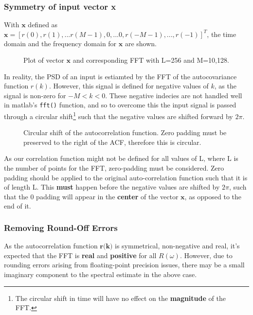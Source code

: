 \documentclass[main.tex]{subfiles}
\begin{document}
\subsubsection{Symmetry of input vector x}

With $\textbf{x}$ defined as $\textbf{x} = [r(0), r(1),...r(M-1),0,...0,r(-M-1),...,r(-1)]^T$, the time domain and the frequency domain for $\textbf{x}$ are shown. 

\begin{figure}[H]
	\centering 
	\resizebox{\textwidth}{!}{}
	\caption{Plot of vector $\textbf{x}$ and corresponding FFT with L=256 and M=10,128.}
	\label{fig:q1_2_a}
\end{figure}


In reality, the PSD of an input is estiamted by the FFT of the autocovariance function $r(k)$. However, this signal is defined for negative values of $k$, as the signal is non-zero for $-M < k < 0$. These negative indecies are not handled well in matlab's {\tt fft()} function, and so to overcome this the input signal is passed through a circular shift\footnote{The circular shift in time will have no effect on the \textbf{magnitude} of the FFT.} such that the negative values are shifted forward by $2\pi$.

\begin{figure}[H]
	\centering 
	\resizebox{0.8\textwidth}{!}{}
	\caption{Circular shift of the autocorrelation function. Zero padding must be preserved to the right of the ACF, therefore this is circular.}
	\label{fig:q1_2_a-shift}
\end{figure}

As our correlation function might not be defined for all values of L, where L is the number of points for the FFT, zero-padding must be considered. Zero padding should be applied to the original auto-correlation function such that it is of length L. This \textbf{must} happen before the negative values are shifted by $2\pi$, such that the 0 padding will appear in the \textbf{center} of the vector $\textbf{x}$, as opposed to the end of it.


\subsubsection{Removing Round-Off Errors}

As the autocorrelation function $\textbf{r(k)}$ is symmetrical, non-negative and real, it's expected that the FFT is \textbf{real} and \textbf{positive} for all $R(\omega)$. However, due to rounding errors arising from floating-point precision issues, there may be a small imaginary component to the spectral estimate in the above case. 
\end{document}
